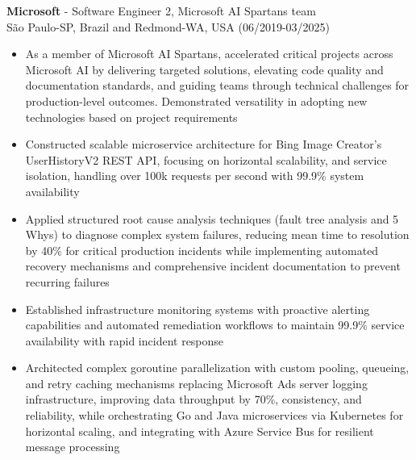 
\normalsize{\textbf{Microsoft} - Software Engineer 2, Microsoft AI Spartans team}\\
\footnotesize{São Paulo-SP, Brazil and Redmond-WA, USA (06/2019-03/2025)}

\begin{itemize}
    \item \small{As a member of Microsoft AI Spartans, accelerated critical projects across Microsoft AI by delivering targeted solutions, elevating code quality and documentation standards, and guiding teams through technical challenges for production-level outcomes. Demonstrated versatility in adopting new technologies based on project requirements}

    \item \small{Constructed scalable microservice architecture for Bing Image Creator's UserHistoryV2 REST API, focusing on horizontal scalability, and service isolation, handling over 100k requests per second with 99.9\% system availability}

    \item \small{Applied structured root cause analysis techniques (fault tree analysis and 5 Whys) to diagnose complex \BackEndWriting system failures, reducing mean time to resolution by 40\% for critical production incidents while implementing automated recovery mechanisms and comprehensive incident documentation to prevent recurring failures}

    \item \small{Established infrastructure monitoring systems with proactive alerting capabilities and automated remediation workflows to maintain 99.9\% service availability with rapid incident response}

    \item \small{Architected complex goroutine parallelization with custom pooling, queueing, and retry caching mechanisms replacing Microsoft Ads server logging infrastructure, improving data throughput by 70\%, consistency, and reliability, while orchestrating Go and Java microservices via Kubernetes for horizontal scaling, and integrating with Azure Service Bus for resilient message processing}


\end{itemize}
